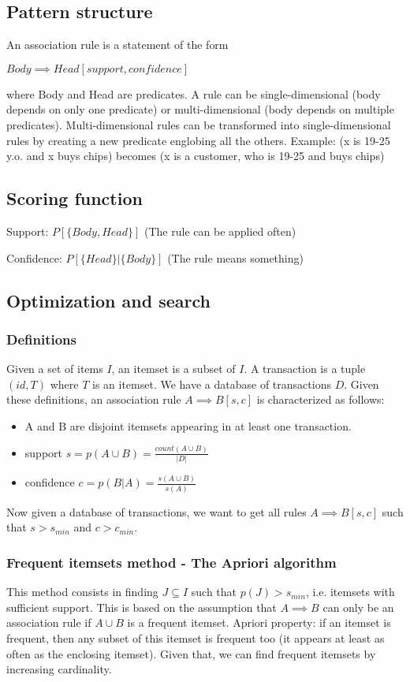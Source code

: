 \subsection{Pattern structure}
An association rule is a statement of the form

$Body \implies Head [support, confidence]$

where Body and Head are predicates.
A rule can be single-dimensional (body depends on only one predicate) or multi-dimensional (body depends on multiple predicates). Multi-dimensional rules can be transformed into single-dimensional rules by creating a new predicate englobing all the others.
Example: (x is 19-25 y.o. and x buys chips) becomes (x is a customer, who is 19-25 and buys chips)

\subsection{Scoring function}
Support: $P[\{Body, Head\}]$ (The rule can be applied often)

Confidence: $P[\{Head\} | \{Body\}]$ (The rule means something)

\subsection{Optimization and search}

\subsubsection{Definitions}
Given a set of items $I$, an itemset is a subset of $I$.
A transaction is a tuple $(id, T)$ where $T$ is an itemset.
We have a database of transactions $D$.
Given these definitions, an association rule $A \implies B [s, c]$ is characterized as follows:
\begin{itemize}
\item A and B are disjoint itemsets appearing in at least one transaction.
\item support $s = p(A \cup B) = \frac{count(A \cup B)}{|D|}$
\item confidence $c = p(B|A) = \frac{s(A \cup B)}{s(A)}$
\end{itemize}

Now given a database of transactions, we want to get all rules $A \implies B [s,c]$ such that $s > s_{min}$ and $c > c_{min}$.

\subsubsection{Frequent itemsets method - The Apriori algorithm}
This method consists in finding $J \subseteq I$ such that $p(J) > s_{min}$, i.e. itemsets with sufficient support.
This is based on the assumption that $A \implies B$ can only be an association rule if $A \cup B$ is a frequent itemset.
Apriori property: if an itemset is frequent, then any subset of this itemset is frequent too (it appears at least as often as the enclosing itemset).
Given that, we can find frequent itemsets by increasing cardinality.

